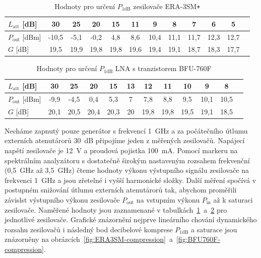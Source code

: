 \documentclass[11pt,a4paper]{article}
\newcommand{\plus}{{\texttt{+}}}
\begin{document}
\begin{table}[!ht]
\begin{center}
\begin{tabular}{| l || c | c | c | c | c | c | c | c | c | c | c |}
    \hline
    $L_{\mathrm{att}}$ [dB] & 30 & 25 & 20 & 15 & 11 & 9 & 8 & 7 & 6 & 5 \\
    \hline
    $P_{\mathrm{out}}$ [dBm] & -10,5 & -5,1 & -0,2 & 4,8 & 8,6 & 10,4 & 11,1 & 11,7 & 12,3 & 12,7 \\
    \hline\hline
    $G$ [dB] & 19,5 & 19,9 & 19,8 & 19,8 & 19,6 & 19,4 & 19,1 & 18,7 & 18,3 & 17,7 \\
    \hline
\end{tabular}
\caption{Hodnoty pro určení $P_{1\mathrm{dB}}$ zesilovače ERA-3SM\plus}
\label{table:ERA3SM-compression}
\end{center}
\end{table}

\begin{table}[!ht]
\begin{center}
\begin{tabular}{| l || c | c | c | c | c | c | c | c | c | c | c |}
    \hline
    $L_{\mathrm{att}}$ [dB] & 30 & 25 & 20 & 15 & 13 & 12 & 11 & 10 & 9 & 8 \\
    \hline
    $P_{\mathrm{out}}$ [dBm] & -9,9 & -4,5 & 0,4 & 5,3 & 7 & 7,8 & 8,8 & 9,5 & 10,1 & 10,5 \\
    \hline\hline
    $G$ [dB] & 20,1 & 20,5 & 20,4 & 20,3 & 20 & 19,8 & 19,8 & 19,5 & 19,1 & 18,5 \\
    \hline
\end{tabular}
\caption{Hodnoty pro určení $P_{1\mathrm{dB}}$ LNA s tranzistorem BFU-760F}
\label{table:BFU760F-compression}
\end{center}
\end{table}

Necháme zapnutý pouze generátor s frekvencí 1~GHz a za počátečního útlumu externích atenutárorů 30~dB připojíme jeden z měřených zesilovačů. Napájecí napětí zesilovače je 12~V a proudová pojistka 100~mA. Pomocí markeru na spektrálním analyzátoru s dostatečně širokým nastaveným rozsahem frekvenční (0,5~GHz až 3,5~GHz) čteme hodnoty výkonu výstupního signálu zesilovače na frekvenci 1~GHz a jsou zřetelné i vyšší harmonické složky. Další měření spočívá v postupném snižování útlumu externích atenutárorů tak, abychom proměřili závislst výstupního výkonu zesilovače $P_{\mathrm{out}}$ na vstupním výkonu $P_{\mathrm{in}}$ až k saturaci zesilovače. Naměřené hodnoty jsou zaznamenané v tabulkách~\ref{table:ERA3SM-compression}~a~\ref{table:BFU760F-compression} pro jednotlivé zesilovače. Grafické znázornění nejprve lineárního chování dynamického rozsahu zesilovačů i následný bod decibelové komprese $P_{1\mathrm{dB}}$ a saturace jsou znázorněny na obrázcích~\ref{fig:ERA3SM-compression}~a~\ref{fig:BFU760F-compression}.
\end{document}
